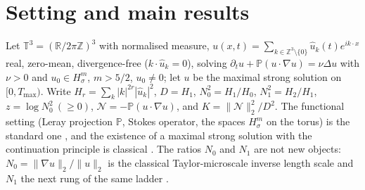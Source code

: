 \documentclass[11pt]{article}
\theoremstyle{definition}
\newcommand{\T}{\mathbb T}
\newcommand{\R}{\mathbb R}
\newcommand{\Z}{\mathbb Z}
\newcommand{\PP}{\mathbb P}
\newcommand{\NN}{\mathcal N}
\begin{document}
\section{Setting and main results}

Let $\T^3=(\R/2\pi\Z)^3$ with normalised measure,
$u(x,t)=\sum_{k\in\Z^3\setminus\{0\}}\hat u_k(t)e^{ik\cdot x}$ real,
zero-mean, divergence-free ($k\cdot\hat u_k=0$), solving
$\partial_tu+\PP(u\cdot\nabla u)=\nu\Delta u$ with $\nu>0$ and
$u_0\in H^m_\sigma$, $m>5/2$, $u_0\neq0$; let $u$ be the maximal
strong solution on $[0,T_{\max})$. Write
$H_r=\sum_k|k|^{2r}|\hat u_k|^2$, $D=H_1$, $N_0^2=H_1/H_0$,
$N_1^2=H_2/H_1$, $z=\log N_0^2\ (\ge0)$,
$\NN=-\PP(u\cdot\nabla u)$, and
$K=\|\NN\|_2^2/D^2$. The functional setting (Leray projection $\PP$,
Stokes operator, the spaces $H^m_\sigma$ on the torus) is the standard
one \cite{ConstantinFoias,Temam}, and the existence of a maximal
strong solution with the continuation principle is classical
\cite{FujitaKato1964,Kato1972,MajdaBertozzi,RRS2016}. The ratios
$N_0$ and $N_1$ are not new objects: $N_0=\|\nabla u\|_2/\|u\|_2$ is
the classical Taylor-microscale inverse length scale and $N_1$ the
next rung of the same ladder
\cite{FoiasGuillopeTemam1981,FMTT1983,BDGM1993,Gibbon1994,DoeringGibbon1995,FMRT2001}.
\end{document}
